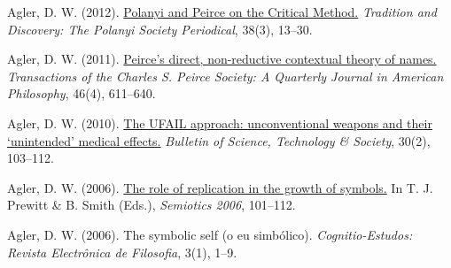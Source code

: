 \documentclass[p1noheader, 11pt]{../lightcv}
\begin{document}
\begin{rlist}[Articles]
    \item Agler, D. W. (2012). \href{https://philpapers.org/rec/AGLPAP}{Polanyi and Peirce on the Critical Method.} \textit{Tradition and Discovery: The Polanyi Society Periodical}, 38(3), 13–30.
    \item Agler, D. W. (2011). \href{https://muse.jhu.edu/article/419995}{Peirce’s direct, non-reductive contextual theory of names.} \textit{Transactions of the Charles S. Peirce Society: A Quarterly Journal in American Philosophy}, 46(4), 611–640.
    \item Agler, D. W. (2010). \href{https://doi.org/10.1177/0270467610361230}{The UFAIL approach: unconventional weapons and their ‘unintended’ medical effects.} \textit{Bulletin of Science, Technology \& Society}, 30(2), 103–112.
    \item Agler, D. W. (2006). \href{https://www.pdcnet.org/pdc/bvdb.nsf/purchase?openform&fp=cpsem&id=cpsem_2006_0101_0112}{The role of replication in the growth of symbols.} In T. J. Prewitt \& B. Smith (Eds.), \textit{Semiotics 2006}, 101–112.
    \item Agler, D. W. (2006). The symbolic self (o eu simbólico). \textit{Cognitio-Estudos: Revista Electrônica de Filosofia}, 3(1), 1–9.
\end{rlist}
\end{document}
